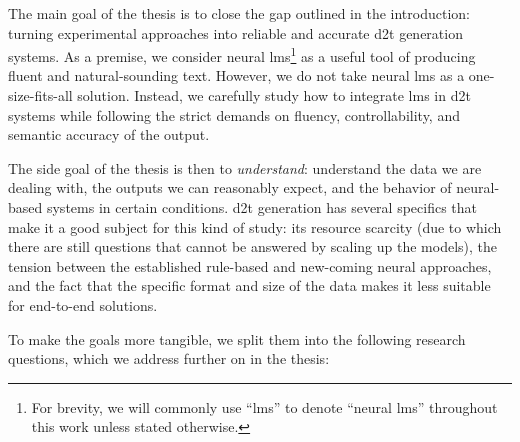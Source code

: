 The main goal of the thesis is to close the gap outlined in the introduction: turning experimental approaches into reliable and accurate \ac{d2t} generation systems. As a premise, we consider neural \acp{lm}\footnote{For brevity, we will commonly use ``\acp{lm}'' to denote ``neural \acp{lm}'' throughout this work unless stated otherwise.} as a useful tool of producing fluent and natural-sounding text.
However, we do not take neural \acp{lm} as a one-size-fits-all solution. Instead, we carefully study how to integrate \acp{lm} in \ac{d2t} systems while following the strict demands on fluency, controllability, and semantic accuracy of the output.

The side goal of the thesis is then to \textit{understand}: understand the data we are dealing with, the outputs we can reasonably expect, and the behavior of neural-based systems in certain conditions. \ac{d2t} generation has several specifics that make it a good subject for this kind of study: its resource scarcity (due to which there are still questions that cannot be answered by scaling up the models), the tension between the established rule-based and new-coming neural approaches, and the fact that the specific format and size of the data makes it less suitable for end-to-end solutions.

To make the goals more tangible, we split them into the following research questions, which we address further on in the thesis:

